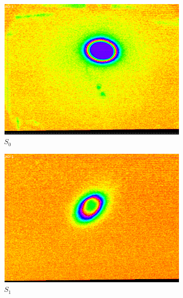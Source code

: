 \documentclass[12pt]{article}
\begin{document}
\begin{figure}[H]
  \centering

 \begin{subfigure}{0.16\textwidth}
    \includegraphics[width=\linewidth]{fig/S0w.png}
    \caption{$S_0$}
  \end{subfigure}%
  \hfill
  \begin{subfigure}{0.16\textwidth}
    \includegraphics[width=\linewidth]{fig/S1.png}
    \caption{$S_1$}
  \end{subfigure}%
  \hfill
  \begin{subfigure}{0.16\textwidth}

\end{subfigure}
\end{figure}
\end{document}
